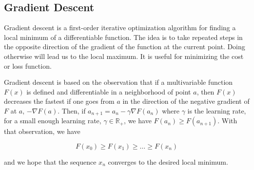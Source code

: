 \documentclass{article}
\begin{document}
\subsection{Gradient Descent}
Gradient descent is a first-order iterative optimization algorithm for finding a local minimum of a differentiable function. 
The idea is to take repeated steps in the opposite direction of the gradient of the function at the current point. Doing 
otherwise will lead us to the local maximum. It is useful for minimizing the cost or loss function. 
\begin{figure}[H]
	\centering
\end{figure}
\noindent Gradient descent is based on the observation that if a multivariable function $F(x)$ is defined and differentiable in a neighborhood 
of point $a$, then $F(x)$ decreases the fastest if one goes from $a$ in the direction of the negative gradient of $F$ at $a$,
$-\nabla F(a)$. Then, if $a_{n+1}=a_n-\gamma \nabla F(a_n)$ where $\gamma$ is the learning rate, for a small enough learning 
rate, $\gamma\in\mathbb{R}_+$, we have $F(a_n)\geq F(a_{n+1})$. With that observation, we have

\begin{equation}
	F(x_0)\geq F(x_1) \geq \dots \geq F(x_n)
	\label{eq:monotonicgradient}
\end{equation}

\noindent and we hope that the sequence $x_n$ converges to the desired local minimum.
\end{document}
